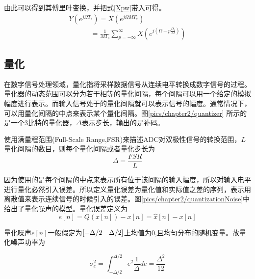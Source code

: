 			由此可以得到其傅里叶变换，并把式\ref{Xpw}带入可得。
			\begin{equation}
				\begin{array}{l}
Y\left( {{e^{j\Omega {T_s}}}} \right) = X\left( {{e^{j\Omega M{T_s}}}} \right)\\
\,\,\,\,\,\,\,\,\,\,\,\,\,\,\,\,\,\,\, = \frac{1}{{M{T_s}}}\sum\limits_{p =  - \infty }^\infty  {X\left( {{e^{j\left( {\Omega  - p\frac{{{\Omega _s}}}{M}} \right)}}} \right)} 
\end{array} \label{eq:Y_upsample}
			\end{equation}
		
	\subsection{量化}
	
	在数字信号处理领域，量化指将采样数据信号从连续电平转换成数字信号的过程。量化器的动态范围可以分为若干相等的量化间隔，每个间隔可以用一个给定的模拟幅度进行表示。而输入信号处于的量化间隔就可以表示信号的幅度。通常情况下，可以用量化间隔的中点来表示某个量化间隔。图\ref{pics/chapter2/quantizer}	所示的是一个3比特的量化器，$\Delta $表示步长，输出的是补码。\par
	
	
	使用满量程范围(Full-Scale Range,FSR)来描述ADC对双极性信号的转换范围，$L$ 量化间隔的数目，则每个量化间隔或者量化步长为$$\Delta  = \frac{{FSR}}{L}$$
	
	因为使用的是每个间隔的中点来表示所有位于该间隔的输入幅度，所以对输入电平进行量化必然引入误差。所以定义量化误差为量化值和实际值之差的序列，表示用离散值来表示连续信号的时候引入的误差。图\ref{pics/chapter2/quantizationNoise}中给出了量化噪声的模型。量化误差定义为
		\begin{equation}
			e[n] = Q(x[n]) - x[n] = \hat x[n] - x[n]
		\end{equation}
		

	
	量化噪声$e[n]$一般假定为$[ - \Delta /2{\kern 1pt} {\kern 1pt} {\kern 1pt} {\kern 1pt} {\kern 1pt} {\kern 1pt} {\kern 1pt} {\kern 1pt} {\kern 1pt} {\kern 1pt} \Delta /2]$上均值为0,且均匀分布的随机变量。故量化噪声功率为
		
		\begin{equation}
			\sigma _e^2 = \int_{ - \Delta /2}^{\Delta /2} {{e^2}} \frac{1}{\Delta }de = \frac{{{\Delta ^2}}}{{12}} \label{quantizationNoise}
		\end{equation}
	
